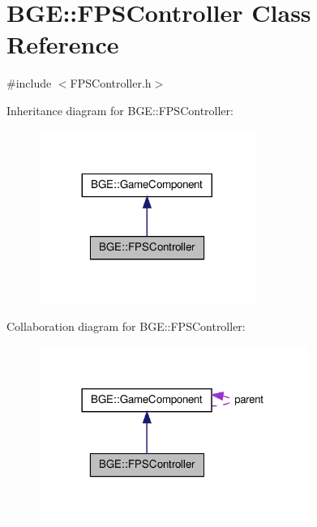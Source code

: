 \hypertarget{class_b_g_e_1_1_f_p_s_controller}{\section{B\-G\-E\-:\-:F\-P\-S\-Controller Class Reference}
\label{class_b_g_e_1_1_f_p_s_controller}
}


{\ttfamily \#include $<$F\-P\-S\-Controller.\-h$>$}



Inheritance diagram for B\-G\-E\-:\-:F\-P\-S\-Controller\-:
\nopagebreak
\begin{figure}[H]
\begin{center}
\leavevmode
\includegraphics[width=200pt]{class_b_g_e_1_1_f_p_s_controller__inherit__graph}
\end{center}
\end{figure}


Collaboration diagram for B\-G\-E\-:\-:F\-P\-S\-Controller\-:
\nopagebreak
\begin{figure}[H]
\begin{center}
\leavevmode
\includegraphics[width=249pt]{class_b_g_e_1_1_f_p_s_controller__coll__graph}
\end{center}
\end{figure}

